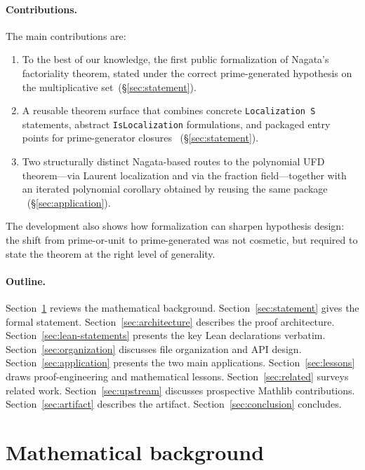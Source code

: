 \documentclass[11pt]{article}
\theoremstyle{plain}
\theoremstyle{definition}
\theoremstyle{remark}
\newcommand{\li}[1]{\texorpdfstring{\texttt{#1}}{#1}}
\begin{document}
\paragraph{Contributions.}
The main contributions are:
\begin{enumerate}[nosep]
\item To the best of our knowledge, the first public formalization of Nagata's
  factoriality theorem, stated under the correct prime-generated hypothesis on
  the multiplicative set~(\S\ref{sec:statement}).
\item A reusable theorem surface that combines concrete
  \li{Localization\,S} statements, abstract \li{IsLocalization} formulations,
  and packaged entry points for prime-generator closures
  ~(\S\ref{sec:statement}).
\item Two structurally distinct Nagata-based routes to the polynomial UFD
  theorem---via Laurent localization and via the fraction field---together with
  an iterated polynomial corollary obtained by reusing the same package
  ~(\S\ref{sec:application}).
\end{enumerate}
The development also shows how formalization can sharpen hypothesis design: the
shift from prime-or-unit to prime-generated was not cosmetic, but required to
state the theorem at the right level of generality.

\paragraph{Outline.}
Section~\ref{sec:background} reviews the mathematical background.
Section~\ref{sec:statement} gives the formal statement.
Section~\ref{sec:architecture} describes the proof architecture.
Section~\ref{sec:lean-statements} presents the key Lean declarations verbatim.
Section~\ref{sec:organization} discusses file organization and API design.
Section~\ref{sec:application} presents the two main applications.
Section~\ref{sec:lessons} draws proof-engineering and mathematical lessons.
Section~\ref{sec:related} surveys related work.
Section~\ref{sec:upstream} discusses prospective Mathlib contributions.
Section~\ref{sec:artifact} describes the artifact.
Section~\ref{sec:conclusion} concludes.


\section{Mathematical background}\label{sec:background}
\end{document}
